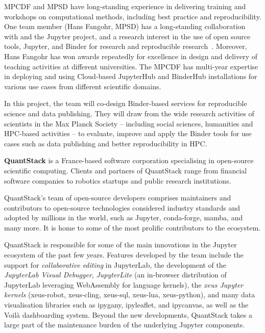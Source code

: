 MPCDF and MPSD have long-standing experience in delivering training and
workshops on computational methods, including best practice and reproducibility.
One team member (Hans Fangohr, MPSD) has a long-standing collaboration with 
and the Jupyter project, and a research interest in the use of open source
tools, Jupyter, and Binder for research and reproducible
research~\cite{Fangohr:ICALEPCS2017-TUCPA01,Fangohr2020,nbval-arxiv,Beg2021}.
Moreover,
Hans Fangohr has won awards repeatedly for excellence in design and delivery of
teaching activities at different universities.
%
The MPCDF has multi-year expertise in deploying and using Cloud-based
JupyterHub and BinderHub installations for various use cases from different
scientific domains.

In this project, the team will co-design Binder-based services for
reproducible science and data publishing. They will draw from the wide research
activities of scientists in the Max Planck Society -- including social sciences,
humanities and HPC-based activities -- to evaluate, improve and apply the Binder
tools for use cases such as data publishing and better reproducibility in HPC.

\medskip \noindent \textbf{QuantStack}
is a France-based software corporation specialising in open-source
scientific computing.
Clients and partners of QuantStack range from financial software companies to robotics
startups and public research institutions.

QuantStack's team of open-source developers comprises maintainers and contributors
to open-source technologies considered industry standards and adopted by millions
in the world, such as Jupyter, conda-forge, mamba, and many more. It is home to
some of the most prolific contributors to the ecosystem.

QuantStack is responsible for some of the main innovations in the Jupyter ecosystem
of the past few years. Features developed by the team include the support for
\emph{collaborative editing} in JupyterLab, the development of the \emph{JupyterLab Visual Debugger},
\emph{JupyterLite} (an in-browser distribution of JupyterLab leveraging WebAssembly for language kernels),
the \emph{xeus Jupyter kernels} (xeus-robot, xeus-cling, xeus-sql, xeus-lua, xeus-python),
and many data visualisation libraries such as ipygany, ipyleaflet, and ipycanvas,
as well as the Voilà dashboarding system. Beyond the new developments, QuantStack takes
a large part of the maintenance burden of the underlying Jupyter components.

